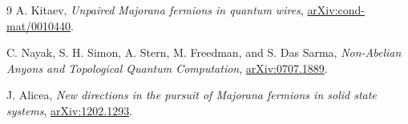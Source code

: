 \documentclass[11pt]{article}
\begin{document}
\begin{thebibliography}{9}
A. Kitaev,
\emph{Unpaired Majorana fermions in quantum wires},
\href{https://arxiv.org/abs/cond-mat/0010440}{arXiv:cond-mat/0010440}.

C. Nayak, S. H. Simon, A. Stern, M. Freedman, and S. Das Sarma,
\emph{Non-Abelian Anyons and Topological Quantum Computation},
\href{https://arxiv.org/abs/0707.1889}{arXiv:0707.1889}.

J. Alicea,
\emph{New directions in the pursuit of Majorana fermions in solid state systems},
\href{https://arxiv.org/abs/1202.1293}{arXiv:1202.1293}.
\end{thebibliography}
\end{document}
